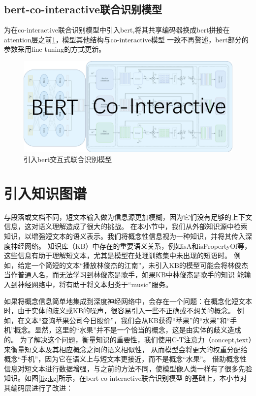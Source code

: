\subsection{bert-co-interactive联合识别模型}

为在co-interactive联合识别模型中引入bert,将其共享编码器换成bert拼接在attention层之前\ref{fig:bert-joint}，模型其他结构与co-interactive模型
一致不再赘述，bert部分的参数采用fine-tuning的方式更新。
\begin{figure}[htbp]
  \centering
  \includegraphics[width=14cm]{./images/bert-joint.jpg}
  \caption{引入bert交互式联合识别模型}
  \label{fig:bert-joint}
\end{figure}


\section{引入知识图谱}
与段落或文档不同，短文本输入做为信息源更加模糊，因为它们没有足够的上下文信息，这对语义理解造成了很大的挑战。
在本小节中，我们从外部知识源中检索知识，以增强短文本的语义表示。我们将概念性信息视为一种知识，并将其传入深度神经网络。
知识库（KB）中存在的重要语义关系，例如isA和isPropertyOf等，这些信息有助于理解短文本，尤其是模型在处理训练集中未出现的短语时。
例如，给定一个简短的文本“播放林俊杰的江南”，未引入KB的模型可能会将林俊杰当作普通人名，而无法学习到林俊杰是歌手，如果KB中林俊杰是歌手的知识
能输入到神经网络中，将有助于将文本归类于“music”服务。

如果将概念信息简单地集成到深度神经网络中，会存在一个问题：在概念化短文本时，由于实体的歧义或KB的噪声，很容易引入一些不正确或不想关的概念。
例如，在文本“查询苹果公司今日股价”，我们会从KB获得“苹果”的“水果”和“手机”概念。显然，这里的“水果”并不是一个恰当的概念，这是由实体的歧义造成的。
为了解决这个问题，衡量知识的重要性，我们使用C-T注意力（concept,text）来衡量短文本及其相应概念之间的语义相似性，
从而模型会将更大的权重分配给概念“手机”，因为它在语义上与短文本更接近，而不是概念“水果”。
借助概念性信息对短文本进行数据增强，与之前的方法不同，使模型像人类一样有了很多先验知识。如图\ref{fig:kg}所示，在bert-co-interactive联合识别模型
的基础上，本小节对其编码层进行了改进：

